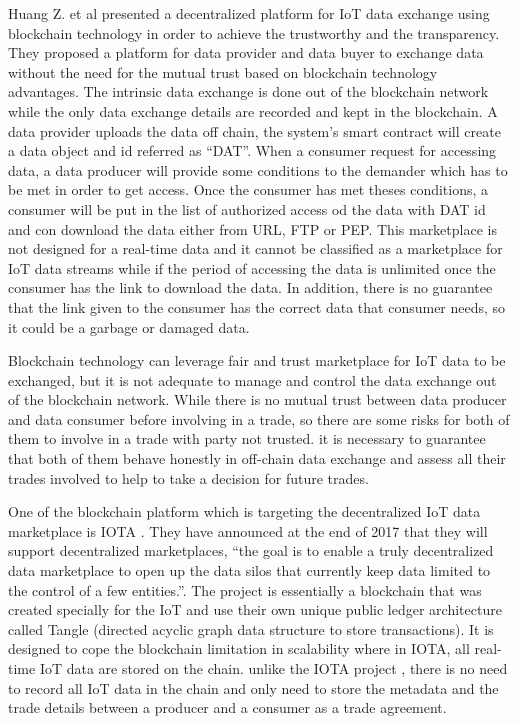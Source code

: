 \documentclass[letterpaper, 10 pt, conference]{ieeeconf}  %
\begin{document}
Huang Z. et al \cite{12} presented a decentralized platform for IoT data exchange using blockchain technology in order to achieve the trustworthy and the transparency. They proposed a platform for data provider and data buyer to exchange data without the need for the mutual trust based on blockchain technology advantages. The intrinsic data exchange is done out of the blockchain network while the only data exchange details are recorded and kept in the blockchain. A data provider uploads the data off chain, the system’s smart contract will create a data object and id referred as “DAT”. When a consumer request for accessing data, a data producer will provide some conditions to the demander which has to be met in order to get access. Once the consumer has met theses conditions, a consumer will be put in the list of authorized access od the data with DAT id and con download the data either from URL, FTP or PEP. This marketplace is not designed for a real-time data and it cannot be classified as a marketplace for IoT data streams while if the period of accessing the data is unlimited once the consumer has the link to download the data. In addition, there is no guarantee that the link given to the consumer has the correct data that consumer needs, so it could be a garbage or damaged data.   
	
Blockchain technology can leverage fair and trust marketplace for IoT data to be exchanged, but it is not adequate to manage and control the data exchange out of the blockchain network. While there is no mutual trust between data producer and data consumer before involving in a trade, so there are some risks for both of them to involve in a trade with party not trusted. it is necessary to guarantee that both of them behave honestly in off-chain data exchange and assess all their trades involved to help to take a decision for future trades.   

One of the blockchain platform which is targeting the decentralized IoT data marketplace is IOTA \cite{20}. They have announced at the end of 2017 that they will support decentralized marketplaces, “the goal is to enable a truly decentralized data marketplace to open up the data silos that currently keep data limited to the control of a few entities.”. 
The project is essentially a blockchain that was created specially for the IoT and use their own unique public ledger architecture called Tangle (directed acyclic graph data structure to store transactions). 
It is designed to cope the blockchain limitation in scalability where in IOTA, all real-time IoT data are stored on the chain. 
unlike the IOTA project \cite{20}, there is no need to record all IoT data in the chain and only need to store the metadata and the trade details between a producer and a consumer as a trade agreement.
\end{document}
